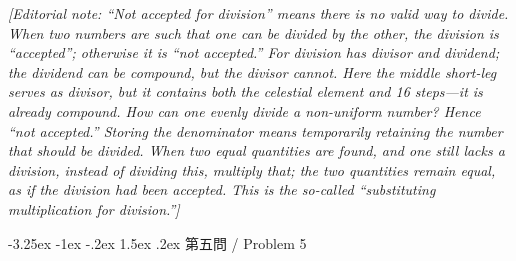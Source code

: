 \documentclass[11pt,a4paper]{article}
\makeatletter
\newlength{\chwidth}
\newcommand{\zh}[1]{{\CJKfamily{sf}#1}}
\newenvironment{bilingual}{%
  \noindent
  \begin{minipage}[t]{\chwidth}%
  \small
}{%
  \end{minipage}%
}
\renewcommand{\subsubsection}{\@startsection{subsubsection}{3}{\z@}%
  {-3.25ex \@plus -1ex \@minus -.2ex}%
  {1.5ex \@plus .2ex}%
  {\normalfont\normalsize\bfseries\color{sectioncolor}}}
\makeatother
\begin{document}
\begin{bilingual}
\vspace{0.2cm}
\noindent\textit{[Editorial note: ``Not accepted for division'' means there is no valid way to divide. When two numbers are such that one can be divided by the other, the division is ``accepted''; otherwise it is ``not accepted.'' For division has divisor and dividend; the dividend can be compound, but the divisor cannot. Here the middle short-leg serves as divisor, but it contains both the celestial element and 16 steps---it is already compound. How can one evenly divide a non-uniform number? Hence ``not accepted.'' Storing the denominator means temporarily retaining the number that should be divided. When two equal quantities are found, and one still lacks a division, instead of dividing this, multiply that; the two quantities remain equal, as if the division had been accepted. This is the so-called ``substituting multiplication for division.'']}
\end{bilingual}

\vspace{0.5cm}

\subsubsection{\zh{第五問} / Problem 5}
\end{document}
